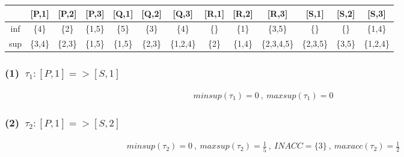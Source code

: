 \documentclass[a4paper,12pt]{jarticle}
\begin{document}
%
\title{\vspace{-30mm} }
\date{}
%
\maketitle
%
\vspace{-20mm}
%
\setlength{\abovedisplayskip}{0pt} %
\setlength{\belowdisplayskip}{0pt} %

\vspace{-3mm}
%
 \begin{table}[htbp]
  \fontsize{10pt}{11pt}\selectfont
  \begin{tabular}{c|cccccccccccc}
       &[P,1]&[P,2]&[P,3]&[Q,1]&[Q,2]&[Q,3]&[R,1]&[R,2]&[R,3]&[S,1]&[S,2]&[S,3]\\\hline
   inf &\{4\}&\{2\}&\{1,5\}&\{5\}&\{3\}&\{4\}&\{\}&\{1\}&\{3,5\}&\{\}&\{\}&\{1,4\}\\
   sup &\{3,4\}&\{2,3\}&\{1,5\}&\{1,5\}&\{2,3\}&\{1,2,4\}&\{2\}&\{1,4\}&\{2,3,4,5\}&\{2,3,5\}&\{3,5\}&\{1,2,4\} 
  \end{tabular}
 \end{table}
%
\vspace{-10mm} 
\subsubsection*{(1)~$\tau_1:[P,1]=>[S,1]$}
\vspace{-4mm}
%
\begin{align*}
 minsup(\tau_1)=0~,~maxsup(\tau_1)=0
\end{align*}
%
\vspace{-10mm}
\subsubsection*{(2)~$\tau_2:[P,1]=>[S,2]$}
\vspace{-4mm}
%
\begin{align*}
 minsup(\tau_2)=0~,~maxsup(\tau_2)=\frac{1}{5}~,~INACC=\{3\}~,~maxacc(\tau_2)=\frac{1}{2}
\end{align*}
%
\vspace{-10mm}
\end{document}
